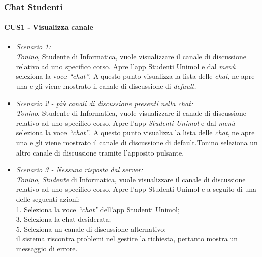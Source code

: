 \subsubsection{Chat Studenti}
\paragraph{CUS1 - Visualizza canale}

\begin{itemize}
	
	\item \textit{Scenario 1:\\}
	\textit{Tonino}, Studente di Informatica, vuole visualizzare il canale di discussione relativo ad uno specifico corso. Apre l’app Studenti Unimol e dal \textit{menù} seleziona la voce \textit{“chat”}. A questo punto visualizza la lista delle \textit{chat}, ne apre una e gli viene mostrato il canale di discussione di \textit{default.\\}
	
	\item \textit{Scenario 2 - più canali di discussione presenti nella chat:\\}
	\textit{Tonino}, Studente di Informatica, vuole visualizzare il canale di discussione relativo ad uno specifico corso. Apre l’app \textit{Studenti Unimol} e dal \textit{menù} seleziona la voce \textit{“chat”}. A questo punto visualizza la lista delle \textit{chat}, ne apre una e gli viene mostrato il canale di discussione di default.Tonino seleziona un altro canale di discussione tramite l’apposito pulsante.\\
	
	\item \textit{Scenario 3 - Nessuna risposta dal server:\\}
	\textit{Tonino}, \textit{Studente} di Informatica, vuole visualizzare il canale di discussione relativo ad uno specifico corso. Apre l’app Studenti Unimol e a seguito di una delle seguenti azioni:\\
	1. Seleziona la voce \textit{“chat”} dell’app Studenti Unimol;\\
	3. Seleziona la chat desiderata;\\
	5. Seleziona un canale di discussione alternativo;\\
	il sistema riscontra problemi nel gestire la richiesta, pertanto mostra un messaggio di errore.\\
	

\end{itemize}
